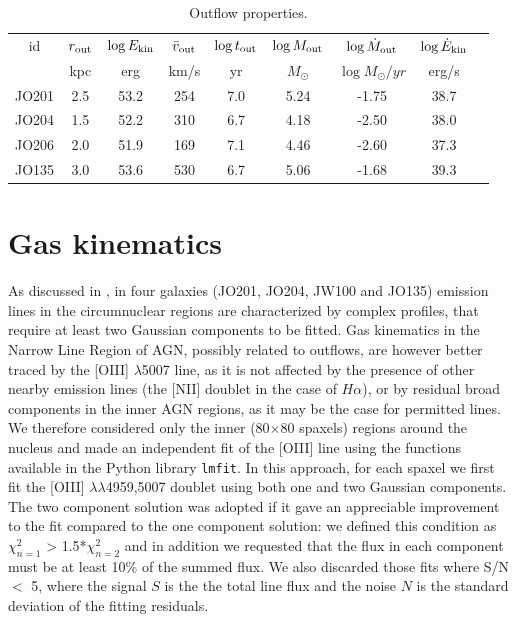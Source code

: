 \documentclass[fleqn,usenatbib]{mnras}
\begin{document}
\begin{table}
	\begin{tabular}{ccccccccc}
		\hline\hline
		id & $r_{\rm out}$ & $\log E_{\rm kin}$ & $\bar{v}_{\rm out}$&$\log t_{\rm out}$  & $\log M_{\rm out}$  & $\log \dot{M}_{\rm out}$ & $\log \dot{E}_{\rm kin}$\\
		& kpc & erg & km/s & yr & $M_\odot$ & $\log M_\odot/yr$ & erg/s  \\
		\hline     
		JO201 & 2.5 & 53.2 & 254& 7.0& 5.24 & -1.75& 38.7 & \\
		JO204 & 1.5 & 52.2 & 310& 6.7& 4.18 & -2.50& 38.0 &\\
		JO206 & 2.0 & 51.9 & 169& 7.1& 4.46 & -2.60& 37.3 &\\
		JO135 & 3.0 & 53.6 & 530& 6.7& 5.06 & -1.68& 39.3 &\\
		\hline    
	\end{tabular} 
	\caption{Outflow properties.}
\end{table}

\section {Gas kinematics}
\label{sect:Outflows}


As discussed in \citet{2017Natur.548..304P}, in 
four galaxies (JO201, JO204, JW100 and JO135) emission lines in the circumnuclear regions are characterized by complex profiles, that require at least two Gaussian components to be fitted.  
Gas kinematics in the Narrow Line Region of AGN, possibly  related to outflows, are however better traced by the [OIII] $\lambda$5007 line, as it is not affected by the presence of other nearby emission lines (the [NII] doublet in the case of $H\alpha$), or by residual broad components in the inner AGN regions, as it may be the case for permitted lines. We therefore considered  only  the inner (80$\times$80 spaxels) regions around the  nucleus and made an independent fit of the [OIII] line using  the  functions available in the Python library \texttt{lmfit}.
In this approach, for each spaxel we first fit the [OIII] $\lambda\lambda$4959,5007 doublet using both one and two Gaussian components. The two component solution was adopted if it gave an appreciable improvement to the fit compared to the one component solution: we defined this condition as $\chi^2_{n=1}$ > 1.5*$\chi^2_{n=2}$ and in addition we requested that the flux in each component must be at least 10\% of the summed flux. We also discarded those fits where S/N $<$ 5, where the signal $S$ is the the total line flux and the noise $N$ is the standard deviation of the fitting residuals. 
\end{document}

